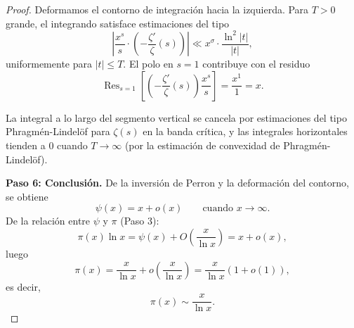 \documentclass[11pt,a4paper]{article}
\theoremstyle{plain}
\theoremstyle{definition}
\begin{document}
\begin{proof}
Deformamos el contorno de integración hacia la izquierda. Para $T>0$ grande, el integrando satisface estimaciones del tipo
\[
\left|\frac{x^{s}}{s}\cdot\left(-\frac{\zeta'}{\zeta}(s)\right)\right|\ll x^{\sigma}\cdot\frac{\ln^{2}|t|}{|t|},
\]
uniformemente para $|t|\le T$. El polo en $s=1$ contribuye con el residuo
\[
\operatorname{Res}_{s=1}\left[\left(-\frac{\zeta'}{\zeta}(s)\right)\frac{x^{s}}{s}\right]=\frac{x^{1}}{1}=x.
\]

La integral a lo largo del segmento vertical se cancela por estimaciones del tipo Phragmén-Lindelöf para $\zeta(s)$ en la banda crítica, y las integrales horizontales tienden a 0 cuando $T\to\infty$ (por la estimación de convexidad de Phragmén-Lindelöf).

\textbf{Paso 6: Conclusión.} De la inversión de Perron y la deformación del contorno, se obtiene
\[
\psi(x)=x+o(x)\qquad\text{cuando }x\to\infty.
\]
De la relación entre $\psi$ y $\pi$ (Paso 3):
\[
\pi(x)\ln x=\psi(x)+O\!\left(\frac{x}{\ln x}\right)=x+o(x),
\]
luego
\[
\pi(x)=\frac{x}{\ln x}+o\!\left(\frac{x}{\ln x}\right)=\frac{x}{\ln x}\left(1+o(1)\right),
\]
es decir,
\[
\pi(x)\sim\frac{x}{\ln x}.
\]
\end{proof}
\end{document}
